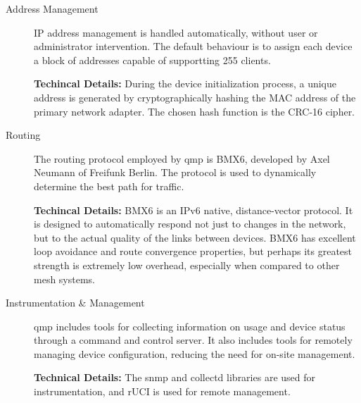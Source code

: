 \begin{description}
\item[Address Management] IP address management is handled automatically,
without user or administrator intervention. The default behaviour is to assign
each device a block of addresses capable of supportting 255 clients. \par 
{\bf Techincal Details:} During the device initialization
process, a unique address is generated by cryptographically hashing the MAC
address of the primary network adapter. The chosen hash function is the CRC-16
cipher. 
\item[Routing] The routing protocol employed by qmp is BMX6, developed
by Axel Neumann of Freifunk Berlin. The protocol is used to dynamically
determine the best path for traffic.
\par
{\bf Techincal Details:}  BMX6 is an IPv6 native, distance-vector protocol.
It is designed to automatically respond not just to changes in the network, but to 
the actual quality of the links between devices. BMX6 has excellent loop
avoidance and route convergence properties, but perhaps its greatest strength is
extremely low overhead, especially when compared to other mesh systems.
\item[Instrumentation \& Management] qmp includes tools for collecting
information on usage and device status through a command and control server. It
also includes tools for remotely managing device configuration, reducing the
need for on-site management. \par
{\bf Technical Details:} The snmp and collectd libraries are used for
instrumentation, and rUCI is used for remote management.
\end{description}

